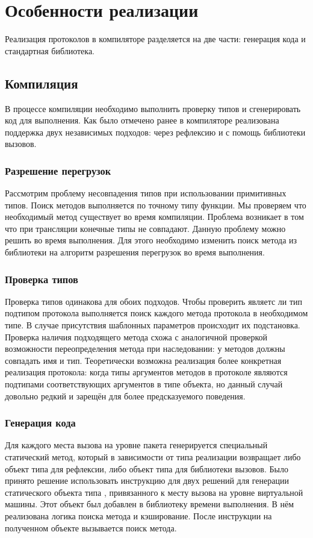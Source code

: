 \section{Особенности реализации}
Реализация протоколов в компиляторе разделяется на две части: генерация кода и стандартная библиотека.

\subsection{Компиляция}
В процессе компиляции необходимо выполнить проверку типов и сгенерировать код для выполнения. Как было отмечено ранее в компиляторе реализована поддержка двух независимых подходов: через рефлексию и с помощь библиотеки вызовов.

\subsubsection{Разрешение перегрузок}
Рассмотрим проблему несовпадения типов при использовании примитивных типов. Поиск методов выполняется по точному типу функции. Мы проверяем что необходимый метод существует во время компиляции. Проблема возникает в том что при трансляции конечные типы не совпадают. Данную проблему можно решить во время выполнения. Для этого необходимо изменить поиск метода из библиотеки на алгоритм разрешения перегрузок во время выполнения.

\subsubsection{Проверка типов}
Проверка типов одинакова для обоих подходов. Чтобы проверить являетс ли тип подтипом протокола выполняется поиск каждого метода протокола в необходимом типе. В случае присутствия шаблонных параметров происходит их подстановка. Проверка наличия подходящего метода схожа с аналогичной проверкой возможности переопределения метода при наследовании: у методов должны совпадать имя и тип. Теоретически возможна реализация более конкретная реализация протокола: когда типы аргументов методов в протоколе являются подтипами соответствующих аргументов в типе объекта, но данный случай довольно редкий и зарещён для более предсказуемого поведения.

\subsubsection{Генерация кода}
Для каждого места вызова на уровне пакета генерируется специальный статический метод, который в зависимости от типа реализации возвращает либо объект типа  для рефлексии, либо объект типа  для библиотеки вызовов. Было принято решение использовать инструкцию  для двух решений для генерации статического объекта типа , привязанного к месту вызова на уровне виртуальной машины. Этот объект был добавлен в библиотеку времени выполнения. В нём реализована логика поиска метода и кэширование. После инструкции  на полученном объекте вызывается поиск метода.

